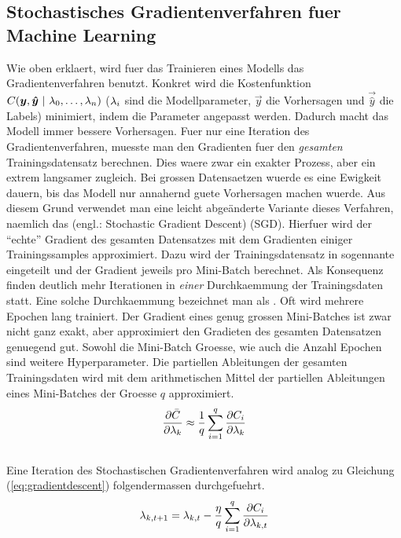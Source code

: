 \subsection{Stochastisches Gradientenverfahren fuer Machine Learning}
Wie oben erklaert, wird fuer das Trainieren eines Modells das Gradientenverfahren benutzt.
Konkret wird die Kostenfunktion $C(\vec{y},\vec{\hat{y}}\ |\ \param_0,\ldots,\param_n)$
($\lambda_i$ sind die Modellparameter, $\vec{y}$ die Vorhersagen und $\vec{\hat{y}}$
die Labels) minimiert, indem die Parameter angepasst werden. Dadurch macht das Modell immer bessere Vorhersagen.
Fuer nur eine Iteration des Gradientenverfahren, muesste man den Gradienten fuer den
\textit{gesamten} Trainingsdatensatz berechnen.
Dies waere zwar ein exakter Prozess, aber ein extrem langsamer zugleich.
Bei grossen Datensaetzen wuerde es eine Ewigkeit dauern, bis das Modell nur annahernd guete Vorhersagen machen wuerde.
\para{}
Aus diesem Grund verwendet man eine leicht abgeänderte Variante dieses
Verfahren, naemlich das  (engl.:
Stochastic Gradient Descent) (SGD).
Hierfuer wird der ``echte'' Gradient des gesamten Datensatzes mit dem Gradienten einiger Trainingssamples approximiert.
Dazu wird der Trainingsdatensatz in sogennante  eingeteilt und der Gradient jeweils pro Mini-Batch berechnet.
Als Konsequenz finden deutlich mehr Iterationen in \textit{einer}
Durchkaemmung der Trainingsdaten statt. Eine solche Durchkaemmung bezeichnet man als
. Oft wird mehrere Epochen lang trainiert.
Der Gradient eines genug grossen Mini-Batches ist zwar nicht ganz exakt, aber approximiert den Gradieten des gesamten Datensatzen genuegend gut.
Sowohl die Mini-Batch Groesse, wie auch die Anzahl Epochen sind weitere Hyperparameter.
\para{}
Die partiellen Ableitungen der gesamten Trainingsdaten wird mit dem
arithmetischen Mittel der partiellen Ableitungen eines Mini-Batches der Groesse $q$ approximiert.
\\
\begin{equation}\label{eq:minibatch_deriv}
  \frac{\partial \bar{C}}{\partial \lambda_k} \approx \frac{1}{q}\sum_{i=1}^{q} \frac{\partial C_i}{\partial \lambda_k}
\end{equation}
\\
Eine Iteration des Stochastischen Gradientenverfahren wird analog zu Gleichung (\ref{eq:gradientdescent}) folgendermassen durchgefuehrt.
\\
\begin{equation}\label{eq:sgd}
  \lambda_{k,t+1} = \lambda_{k,t} - \frac{\eta}{q} \sum_{i=1}^{q} \frac{\partial C_i}{\partial \lambda_{k,t}}
\end{equation}

